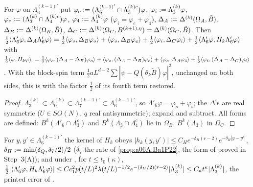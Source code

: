 \begin{lemma}\label{lem:a06f:C53}
For $\varphi$ on $\Lambda^{(k-1)'}_6$ put $\varphi_o:=(\Lambda^{(k-1)'}_6\cap\Lambda^{(k)c}_3)\varphi$, $\varphi_i:=\Lambda^{(k)}_3\varphi$, $\varphi_e:=(\Lambda^{(k)}_3\cap\Lambda^{(k)c}_4)\varphi$, $\varphi_4:=\Lambda^{(k)}_4\varphi$ ($\varphi_i=\varphi_e+\varphi_4$), $\Delta_A:=\Delta^{(k)}(\Omega_A,\tilde B)$, $\Delta_B:=\Delta^{(k)}(\Omega_B,\tilde B)$, $\Delta_C:=\Delta^{(k)}(\Omega_C,B^{(k+1),\eta})=\Delta^{(k)}(\Omega_C,\tilde B)$. Then $\frac12\langle \Lambda'_6\varphi,\Delta_A\Lambda'_6\varphi\rangle=\frac12\langle \varphi_o,\Delta_B\varphi_o\rangle+\langle \varphi_o,\Delta_B\varphi_e\rangle+\frac12\langle \varphi_i,\Delta_C\varphi_i\rangle+\frac12\langle \Lambda'_6\varphi,H_k\Lambda'_6\varphi\rangle$ with $\frac12\langle \varphi,H_k\varphi\rangle:=\frac12\langle \varphi_o,(\Delta_A-\Delta_B)\varphi_o\rangle+\langle \varphi_o,(\Delta_A-\Delta_B)\varphi_e\rangle+\langle \varphi_o,\Delta_A\varphi_4\rangle+\frac12\langle \varphi_i,(\Delta_A-\Delta_C)\varphi_i\rangle$. With the block-spin term $\frac12aL^{d-2}\sum|\psi-Q(\theta_k\tilde B)\varphi|^2$, unchanged on both sides, this is \cite[(2.108)]{Ba2} with the factor $\frac12$ of its fourth term restored.
\end{lemma}

\begin{proof}
$\Lambda^{(k)}_3\subset\Lambda^{(k)}_0\subset\Lambda^{(k-1)'}_7\subset\Lambda^{(k-1)'}_6$, so $\Lambda'_6\varphi=\varphi_o+\varphi_i$; the $\Delta$'s are real symmetric ($U\in SO(N)$, $q$ real antisymmetric); expand and subtract. All forms are defined: $B^k(\Lambda'_6\cap\Lambda^c_3)$ and $B^k(\Lambda_3\cap\Lambda_4^c)$ lie in $\Omega_B$, $B^k(\Lambda_3)$ in $\Omega_C$.
\end{proof}

\begin{lemma}[{\cite[(2.109)]{Ba2}}]\label{lem:a06f:C54}
For $y,y'\in\Lambda^{(k-1)'}_6$ the kernel of $H_k$ obeys $|h_k(y,y')|\le C_He^{-\delta_H(r-2)}e^{-\delta_H|y-y'|}$, $\delta_H:=\min(\delta_Q,\delta_7/2)/2$ ($\delta_7$ the rate of \cref{prop:a06A:Ba1P22}, the form of \cite[(2.27)]{Ba1} proved in Step~3(A)); and under \cite[(2.55)]{Ba2}, for $t\le t_0(\kappa)$, $\frac12|\langle \Lambda'_6\varphi,H_k\Lambda'_6\varphi\rangle|\le Cc_1^2p(t/L)^2\lambda(t/L)^{-1/2}e^{-(\delta_H/2)(r-2)}|\Lambda^{(k)}_3|\le C_\kappa t^\kappa|\Lambda^{(k)}_3|$, the printed error of \cite[(2.108)]{Ba2}.
\end{lemma}

